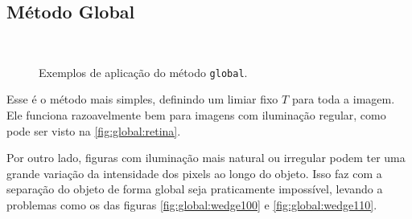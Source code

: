 \subsection{Método Global}

\begin{figure}[H]
    \centering
    \\[8pt]

    \caption{Exemplos de aplicação do método \texttt{global}.}
    \label{fig:global}
\end{figure}

Esse é o método mais simples, definindo um limiar fixo $T$ para toda a imagem. Ele funciona razoavelmente bem para imagens com iluminação regular, como pode ser visto na \cref{fig:global:retina}.

Por outro lado, figuras com iluminação mais natural ou irregular podem ter uma grande variação da intensidade dos pixels ao longo do objeto. Isso faz com a separação do objeto de forma global seja praticamente impossível, levando a problemas como os das figuras \ref{fig:global:wedge100} e \ref{fig:global:wedge110}.